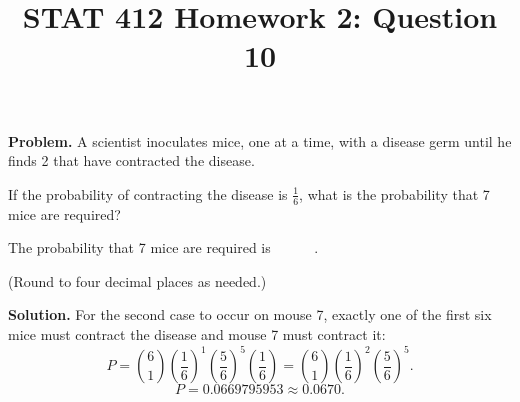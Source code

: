 \documentclass[11pt]{article}
\title{STAT 412 Homework 2: Question 10}
\author{}
\date{}
\begin{document}
\maketitle
\textbf{Problem.} A scientist inoculates mice, one at a time, with a disease
germ until he finds 2 that have contracted the disease.

If the probability of contracting the disease is \(\frac{1}{6}\), what is the
probability that 7 mice are required?

The probability that 7 mice are required is \(\boxed{\phantom{0.0000}}\).

(Round to four decimal places as needed.)

\textbf{Solution.} For the second case to occur on mouse 7, exactly one of the
first six mice must contract the disease and mouse 7 must contract it:
\[
P=\binom61\left(\frac16\right)^1\left(\frac56\right)^5
\left(\frac16\right)
=\binom61\left(\frac16\right)^2\left(\frac56\right)^5.
\]
\[
P=0.0669795953\approx\boxed{0.0670}.
\]
\end{document}

